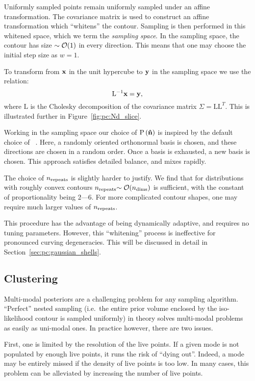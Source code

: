 Uniformly sampled points remain uniformly sampled under an affine transformation. The covariance matrix is used to construct an affine transformation which ``whitens'' the contour. Sampling is then performed in this whitened space, which we term the {\em sampling space}.
In the sampling space, the contour has size ${\sim\mathcal{O}{\left(1\right)}}$ in every direction. This means that one may choose the initial step size as $w=1$.

To transform from $\mathbf{x}$ in the unit hypercube to $\mathbf{y}$ in the sampling space we use the relation:
\begin{equation}
  \mathrm{L}^{-1}\mathbf{x} =  \mathbf{y},
  \label{eqn:pc:cholesky}
\end{equation}
where $\mathrm{L}$ is the Cholesky decomposition of the covariance matrix $\Sigma = \mathrm{L} \mathrm{L}^{T}$.
This is illustrated further in Figure~\ref{fig:pc:Nd_slice}.

Working in the sampling space our choice of $\mathrm{P}\left(\mathbf{\hat{n}}\right)$ is inspired by the default choice of \CosmoMC{}~\citep{LewisFastSlow}. Here, a randomly oriented orthonormal basis is chosen, and these directions are chosen in a random order. Once a basis is exhausted, a new basis is chosen. This approach satisfies detailed balance, and mixes rapidly.

The choice of $n_{\mathrm{repeats}}$ is slightly harder to justify. We find that for distributions with roughly convex contours $n_{\mathrm{repeats}}{\sim\mathcal{O}{\left(n_{\mathrm{dims}}\right)}}$ is sufficient, with the constant of proportionality being $2$---$6$. For more complicated contour shapes, one may require much larger values of $n_{\mathrm{repeats}}$. 

This procedure has the advantage of being dynamically adaptive, and requires no tuning parameters. However, this ``whitening'' process is ineffective for pronounced curving degeneracies. This will be discussed in detail in Section~\ref{sec:pc:gaussian_shells}.


\subsection{Clustering}
\label{sec:pc:clustering}
Multi-modal posteriors are a challenging problem for any sampling algorithm. ``Perfect'' nested sampling (i.e.\ the entire prior volume enclosed by the iso-likelihood contour is sampled uniformly) in theory solves multi-modal problems as easily as uni-modal ones. In practice however, there are two issues.

First, one is limited by the resolution of the live points. If a given mode is not populated by enough live points, it runs the risk of ``dying out''. Indeed, a mode may be entirely missed if the density of live points is too low. In many cases, this problem can be alleviated by increasing the number of live points.

